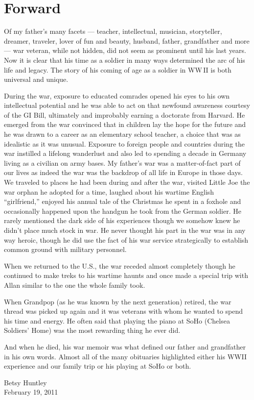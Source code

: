 \chapter*{Forward}

\thispagestyle{plain}
\label{forward}
Of my father's many facets --- teacher, intellectual, musician, storyteller, dreamer, traveler, lover of fun and beauty, husband, father, grandfather and more --- war veteran, while not hidden, did not seem as prominent until his last years. Now it is clear that his time as a soldier in many ways determined the arc of his life and legacy. The story of his coming of age as a soldier in WW\,II is both universal and unique.

During the war, exposure to educated comrades opened his eyes to his own intellectual potential and he was able to act on that newfound awareness courtesy of the GI Bill, ultimately and improbably earning a doctorate from Harvard. He emerged from the war convinced that in children lay the hope for the future and he was drawn to a career as an elementary school teacher, a choice that was as idealistic as it was unusual. Exposure to foreign people and countries during the war instilled a lifelong wanderlust and also led to spending a decade in Germany living as a civilian on army bases. My father's war was a matter-of-fact part of our lives as indeed the war was the backdrop of all life in Europe in those days. We traveled to places he had been during and after the war, visited Little Joe the war orphan he adopted for a time, laughed about his wartime English ``girlfriend,'' enjoyed his annual tale of the Christmas he spent in a foxhole and occasionally happened upon the handgun he took from the German soldier. He rarely mentioned the dark side of his experiences though we somehow knew he didn't place much stock in war. He never thought his part in the war was in any way heroic, though he did use the fact of his war service strategically to establish common ground with military personnel.

When we returned to the U.S., the war receded almost completely though he continued to make treks to his wartime haunts and once made a special trip with Allan similar to the one the whole family took.

When Grandpop (as he was known by the next generation) retired, the war thread was picked up again and it was veterans with whom he wanted to spend his time and energy. He often said that playing the piano at SoHo (Chelsea Soldiers' Home) was the most rewarding thing he ever did.

And when he died, his war memoir was what defined our father and grandfather in his own words. Almost all of the many obituaries highlighted either his WWII experience and our family trip or his playing at SoHo or both.

\begin{flushright}
Betsy Huntley\\
February 19, 2011
\end{flushright}
\clearpage
